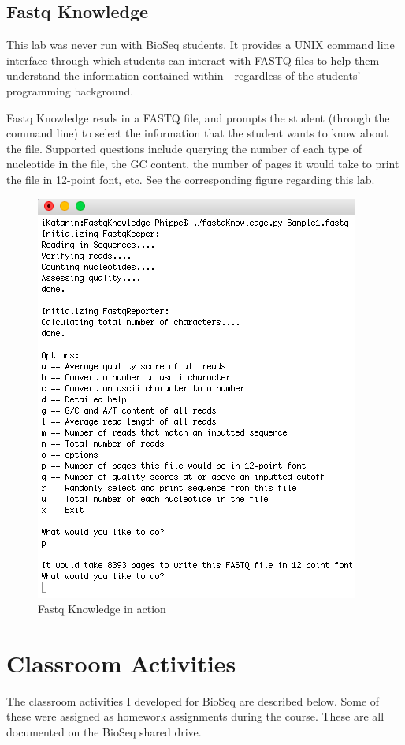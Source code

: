 \documentclass{report}
\begin{document}
\subsection{Fastq Knowledge}
\noindent This lab was never run with BioSeq students. It provides a UNIX command line interface through which students can interact with FASTQ files to help them understand the information contained within - regardless of the students' programming background.

Fastq Knowledge reads in a FASTQ file, and prompts the student (through the command line) to select the information that the student wants to know about the file. Supported questions include querying the number of each type of nucleotide in the file, the GC content, the number of pages it would take to print the file in 12-point font, etc. See the corresponding figure regarding this lab.

\begin{figure}[h]
\centering
\includegraphics[scale=0.75]{fastqK.png}
\caption{Fastq Knowledge in action}
\end{figure}


\section{Classroom Activities}
The classroom activities I developed for BioSeq are described below. Some of these were assigned as homework assignments during the course. These are all documented on the BioSeq shared drive.
\end{document}
